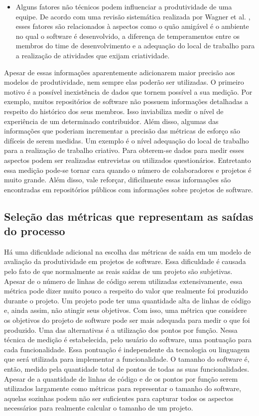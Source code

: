 \begin{itemize}
\item Alguns fatores não técnicos podem influenciar a produtividade de uma equipe. De acordo com uma revisão sistemática realizada por Wagner et al. \cite{wagner2018systematic}, esses fatores são relacionados à aspectos como o quão amigável é o ambiente no qual o software é desenvolvido, a diferença de temperamentos entre os membros do time de desenvolvimento e a adequação do local de trabalho para a realização de atividades que exijam criatividade.


\end{itemize}


Apesar de essas informações aparentemente adicionarem maior precisão aos modelos de produtividade, nem sempre elas poderão ser utilizadas. O primeiro motivo é a possível inexistência de dados que tornem possível a sua medição. Por exemplo, muitos repositórios de software não possuem informações detalhadas a respeito do histórico dos seus membros. Isso inviabiliza medir o nível de experiência de um determinado contribuidor. Além disso, algumas das informações que poderiam incrementar a precisão das métricas de esforço são difíceis de serem medidas. Um exemplo é o nível  adequação do local de trabalho  para a realização de trabalho criativo. Para obterem-se dados para medir esses aspectos podem ser realizadas entrevistas ou utilizados questionários. Entretanto essa medição pode-se tornar cara quando o número de colaboradores e projetos é muito grande. Além disso, vale reforçar, dificilmente essas informações são encontradas em repositórios públicos com informações sobre projetos de software.

\subsection{Seleção das métricas que representam as saídas do processo}
\label{modelo_concreto_saidas}

Há uma dificuldade adicional na escolha das métricas de saída em um modelo de avaliação da produtividade em projetos de software. Essa dificuldade é causada pelo fato de que normalmente as reais saídas de um projeto são subjetivas. Apesar de o número de linhas de código serem utilizadas extensivamente, essa métrica pode dizer muito pouco a respeito do valor que realmente foi produzido durante o projeto. Um projeto pode ter uma quantidade alta de linhas de código e, ainda assim, não atingir seus objetivos. Com isso, uma métrica que considere os objetivos do projeto de software pode ser mais adequada para medir o que foi produzido. Uma das alternativas é a utilização dos pontos por função. Nessa técnica de medição é estabelecida, pelo usuário do software, uma pontuação para cada funcionalidade. Essa pontuação é independente da tecnologia ou linguagem que será utilizada para implementar a funcionalidade. O tamanho do software é, então, medido pela quantidade total de pontos de todas as suas funcionalidades\cite{jeffery1997function}. Apesar de a quantidade de linhas de código e de os pontos por função serem utilizados largamente como métricas para representar o tamanho do software, aquelas sozinhas podem não ser suficientes para capturar todos os aspectos necessários para realmente calcular o tamanho de um projeto. 

